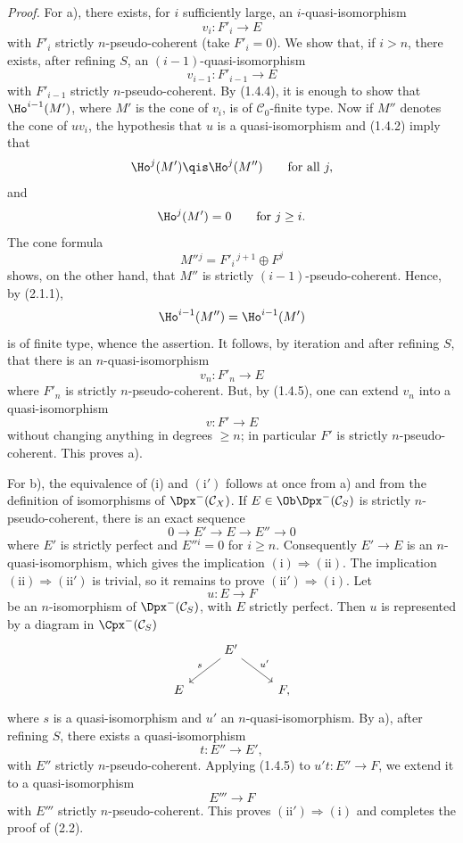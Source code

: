 \documentclass[11pt]{article}
\begin{document}
\emph{Proof.} For a), there exists, for \(i\) sufficiently large, an \(i\)-quasi-isomorphism
\[
  v_i:F'_i\longrightarrow E
\]
with \(F'_i\) strictly \(n\)-pseudo-coherent (take \(F'_i=0\)). We show that, if \(i>n\), there exists, after refining \(S\), an \((i-1)\)-quasi-isomorphism
\[
  v_{i-1}:F'_{i-1}\longrightarrow E
\]
with \(F'_{i-1}\) strictly \(n\)-pseudo-coherent. By (1.4.4), it is enough to show that \(\Ho^{i-1}(M')\), where \(M'\) is the cone of \(v_i\), is of \(\mathcal C_0\)-finite type. Now if \(M''\) denotes the cone of \(uv_i\), the hypothesis that \(u\) is a quasi-isomorphism and (1.4.2) imply that
\[
  \Ho^j(M')\qis \Ho^j(M'')\qquad\text{for all }j,
\]
and
\[
  \Ho^j(M')=0\qquad\text{for }j\geq i.
\]
The cone formula
\[
  M''{}^j=F'_i{}^{\,j+1}\oplus F^j
\]
shows, on the other hand, that \(M''\) is strictly \((i-1)\)-pseudo-coherent. Hence, by (2.1.1),
\[
  \Ho^{i-1}(M'')=\Ho^{i-1}(M')
\]
is of finite type, whence the assertion. It follows, by iteration and after refining \(S\), that there is an \(n\)-quasi-isomorphism
\[
  v_n:F'_n\longrightarrow E
\]
where \(F'_n\) is strictly \(n\)-pseudo-coherent. But, by (1.4.5), one can extend \(v_n\) into a quasi-isomorphism
\[
  v:F'\longrightarrow E
\]
without changing anything in degrees \(\geq n\); in particular \(F'\) is strictly \(n\)-pseudo-coherent. This proves a).

For b), the equivalence of (i) and \((\mathrm{i}')\) follows at once from a) and from the definition of isomorphisms of \(\Dpx^-(\mathcal C_X)\). If \(E\in\Ob\Dpx^-(\mathcal C_S)\) is strictly \(n\)-pseudo-coherent, there is an exact sequence
\[
  0\longrightarrow E'\longrightarrow E\longrightarrow E''\longrightarrow 0
\]
where \(E'\) is strictly perfect and \(E''{}^i=0\) for \(i\geq n\). Consequently \(E'\to E\) is an \(n\)-quasi-isomorphism, which gives the implication \((\mathrm{i})\Rightarrow(\mathrm{ii})\). The implication \((\mathrm{ii})\Rightarrow(\mathrm{ii}')\) is trivial, so it remains to prove \((\mathrm{ii}')\Rightarrow(\mathrm{i})\). Let
\[
  u:E\longrightarrow F
\]
be an \(n\)-isomorphism of \(\Dpx^-(\mathcal C_S)\), with \(E\) strictly perfect. Then \(u\) is represented by a diagram in \(\Cpx^-(\mathcal C_S)\)
\[
\begin{tikzcd}
& E' \arrow[dl,"s"'] \arrow[dr,"u'"]\\
E && F ,
\end{tikzcd}
\]
where \(s\) is a quasi-isomorphism and \(u'\) an \(n\)-quasi-isomorphism. By a), after refining \(S\), there exists a quasi-isomorphism
\[
  t:E''\longrightarrow E',
\]
with \(E''\) strictly \(n\)-pseudo-coherent. Applying (1.4.5) to \(u't:E''\to F\), we extend it to a quasi-isomorphism
\[
  E'''\longrightarrow F
\]
with \(E'''\) strictly \(n\)-pseudo-coherent. This proves \((\mathrm{ii}')\Rightarrow(\mathrm{i})\) and completes the proof of (2.2).
\end{document}
